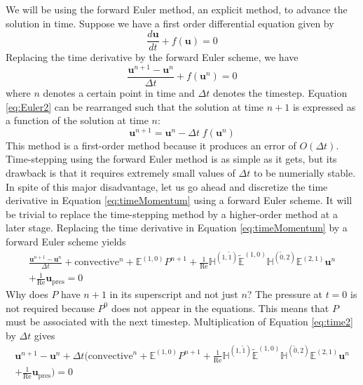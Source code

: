 We will be using the forward Euler method, an explicit method, to advance the solution in time. Suppose we have a first order differential equation given by
\begin{equation}
    \label{eq:Euler1}
    \frac{d \mathbf{u}}{dt} + f(\mathbf{u}) = 0
\end{equation}
Replacing the time derivative by the forward Euler scheme, we have
\begin{equation}
    \label{eq:Euler2}
    \frac{\mathbf{u}^{n+1} - \mathbf{u}^{n}}{\Delta t} + f(\mathbf{u}^{n}) = 0
\end{equation}
where $n$ denotes a certain point in time and $\Delta t$ denotes the timestep. Equation \eqref{eq:Euler2} can be rearranged such that the solution at time $n+1$ is expressed as a function of the solution at time $n$:
\begin{equation}
    \label{eq:time1}
    \mathbf{u}^{n+1} = \mathbf{u}^{n} - \Delta t \; f(\mathbf{u}^{n})
\end{equation}
This method is a first-order method because it produces an error of $O(\Delta t)$. Time-stepping using the forward Euler method is as simple as it gets, but its drawback is that it requires extremely small values of $\Delta t$ to be numerially stable. In spite of this major disadvantage, let us go ahead and discretize the time derivative in Equation \eqref{eq:timeMomentum} using a forward Euler scheme. It will be trivial to replace the time-stepping method by a higher-order method at a later stage. Replacing the time derivative in Equation \eqref{eq:timeMomentum} by a forward Euler scheme yields
\begin{multline}
    \label{eq:time2}
    \frac{\mathbf{u}^{n+1} - \mathbf{u}^{n}}{\Delta t} + \text{convective}^{n} + \mathbb{E}^{(1,0)} P^{n+1} + \frac{1}{\text{Re}} \mathbb{H}^{(1,\tilde{1})} \tilde{\mathbb{E}}^{(1,0)} \mathbb{H}^{(\tilde{0},2)} \mathbb{E}^{(2,1)} \mathbf{u}^{n} \\
    + \frac{1}{\text{Re}} \mathbf{u}_{\text{pres}} = 0
\end{multline}
Why does $P$ have $n + 1$ in its superscript and not just $n$? The pressure at $t = 0$ is not required because $P^0$ does not appear in the equations. This means that $P$ must be associated with the next timestep. Multiplication of Equation \eqref{eq:time2} by $\Delta t$ gives
\begin{multline}
    \label{eq:time3}
    \mathbf{u}^{n+1} - \mathbf{u}^{n} + \Delta t \biggl( \text{convective}^{n} + \mathbb{E}^{(1,0)} P^{n+1} + \frac{1}{\text{Re}} \mathbb{H}^{(1,\tilde{1})} \tilde{\mathbb{E}}^{(1,0)} \mathbb{H}^{(\tilde{0},2)} \mathbb{E}^{(2,1)} \mathbf{u}^{n} \\
    + \frac{1}{\text{Re}} \mathbf{u}_{\text{pres}} \biggr) = 0
\end{multline}
